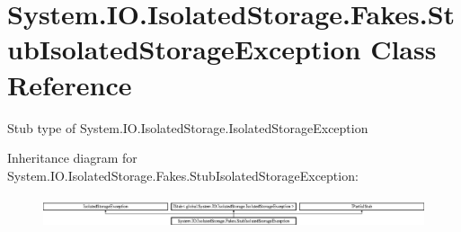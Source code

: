 \hypertarget{class_system_1_1_i_o_1_1_isolated_storage_1_1_fakes_1_1_stub_isolated_storage_exception}{\section{System.\-I\-O.\-Isolated\-Storage.\-Fakes.\-Stub\-Isolated\-Storage\-Exception Class Reference}
\label{class_system_1_1_i_o_1_1_isolated_storage_1_1_fakes_1_1_stub_isolated_storage_exception}
}


Stub type of System.\-I\-O.\-Isolated\-Storage.\-Isolated\-Storage\-Exception 


Inheritance diagram for System.\-I\-O.\-Isolated\-Storage.\-Fakes.\-Stub\-Isolated\-Storage\-Exception\-:\begin{figure}[H]
\begin{center}
\leavevmode
\includegraphics[height=0.924092cm]{class_system_1_1_i_o_1_1_isolated_storage_1_1_fakes_1_1_stub_isolated_storage_exception}
\end{center}
\end{figure}
